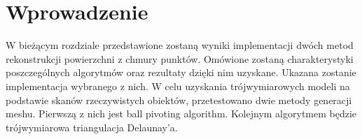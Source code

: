 \section{Wprowadzenie}
W bieżącym rozdziale przedstawione zostaną wyniki implementacji dwóch metod rekonstrukcji powierzchni z chmury punktów. Omówione zostaną charakterystyki poszczególnych algorytmów oraz rezultaty dzięki nim uzyskane. Ukazana zostanie implementacja wybranego z nich.
W celu uzyskania trójwymiarowych modeli na podstawie skanów rzeczywistych obiektów, przetestowano dwie metody generacji meshu. Pierwszą z nich jest ball pivoting algorithm. Kolejnym algorytmem będzie trójwymiarowa triangulacja Delaunay'a.

